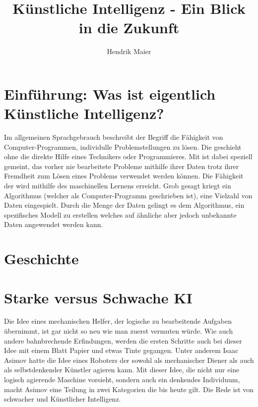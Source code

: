 \documentclass[12pt]{report}
\title{Künstliche Intelligenz - Ein Blick in die Zukunft}
\author{Hendrik Maier}
\date{}
\begin{document}
    \maketitle

    \tableofcontents
    \newpage

    \section{Einführung: Was ist eigentlich Künstliche Intelligenz?}
    Im allgemeinen Sprachgebrauch beschreibt der Begriff  die Fähigkeit von Computer-Programmen,
    individulle Problemstellungen zu lösen. Die geschieht ohne die direkte Hilfe eines Technikers oder Programmieres.
    Mit  ist dabei speziell gemeint, das vorher nie bearbeitete Probleme mithilfe ihrer Daten
    trotz ihrer Fremdheit zum Lösen eines Problems verwendet werden können. Die Fähigkeit der 
    wird mithilfe des maschinellen Lernens erreicht. Grob gesagt kriegt ein Algorithmus (welcher als Computer-Programm geschrieben ist),
    eine Vielzahl von Daten eingespielt. Durch die Menge der Daten gelingt es dem Algorithmus, ein spezifisches
    Modell zu erstellen welches auf ähnliche aber jedoch unbekannte Daten angewendet werden kann.
    
    \section{Geschichte}

    \section{Starke versus Schwache KI}
    Die Idee eines mechanischen Helfer, der logische zu bearbeitende Aufgaben übernimmt, ist gar nicht so neu wie man
    zuerst vermuten würde. Wie auch andere bahnbrechende Erfindungen, werden die ersten Schritte auch bei dieser Idee
    mit einem Blatt Papier und etwas Tinte gegangen. Unter anderem Isaac Asimov hatte die Idee
    eines Roboters der sowohl als mechanischer Diener als auch als selbstdenkender Künstler agieren kann.\cite{asimov2000der}
    Mit dieser Idee, die nicht nur eine logisch agierende Maschine vorsieht, sondern auch ein denkendes Individuum, macht Asimov
    eine Teilung in zwei Kategorien die bis heute gilt. Die Rede ist von schwacher und Künstlicher Intelligenz.\\
\end{document}
